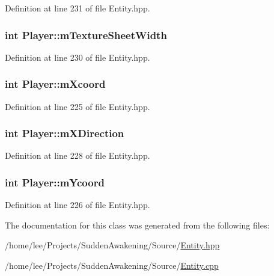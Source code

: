 Definition at line 231 of file Entity.\-hpp.

\hypertarget{class_player_abdccfacdffb3a21371af39dbe0255453}{
\subsubsection[{m\-Texture\-Sheet\-Width}]{\setlength{\rightskip}{0pt plus 5cm}int Player\-::m\-Texture\-Sheet\-Width\hspace{0.3cm}{\ttfamily [protected]}}}\label{class_player_abdccfacdffb3a21371af39dbe0255453}


Definition at line 230 of file Entity.\-hpp.

\hypertarget{class_player_ab5f657ba805e70319fc312533d715d96}{
\subsubsection[{m\-Xcoord}]{\setlength{\rightskip}{0pt plus 5cm}int Player\-::m\-Xcoord\hspace{0.3cm}{\ttfamily [protected]}}}\label{class_player_ab5f657ba805e70319fc312533d715d96}


Definition at line 225 of file Entity.\-hpp.

\hypertarget{class_player_a141ca66b2ec828bb84617b21dc7e9db0}{
\subsubsection[{m\-X\-Direction}]{\setlength{\rightskip}{0pt plus 5cm}int Player\-::m\-X\-Direction\hspace{0.3cm}{\ttfamily [protected]}}}\label{class_player_a141ca66b2ec828bb84617b21dc7e9db0}


Definition at line 228 of file Entity.\-hpp.

\hypertarget{class_player_ab3a89b65abf92da672ebc3c55b22dc80}{
\subsubsection[{m\-Ycoord}]{\setlength{\rightskip}{0pt plus 5cm}int Player\-::m\-Ycoord\hspace{0.3cm}{\ttfamily [protected]}}}\label{class_player_ab3a89b65abf92da672ebc3c55b22dc80}


Definition at line 226 of file Entity.\-hpp.



The documentation for this class was generated from the following files\-:\begin{DoxyCompactItemize}
\item 
/home/lee/\-Projects/\-Sudden\-Awakening/\-Source/\hyperlink{_entity_8hpp}{Entity.\-hpp}\item 
/home/lee/\-Projects/\-Sudden\-Awakening/\-Source/\hyperlink{_entity_8cpp}{Entity.\-cpp}\end{DoxyCompactItemize}
